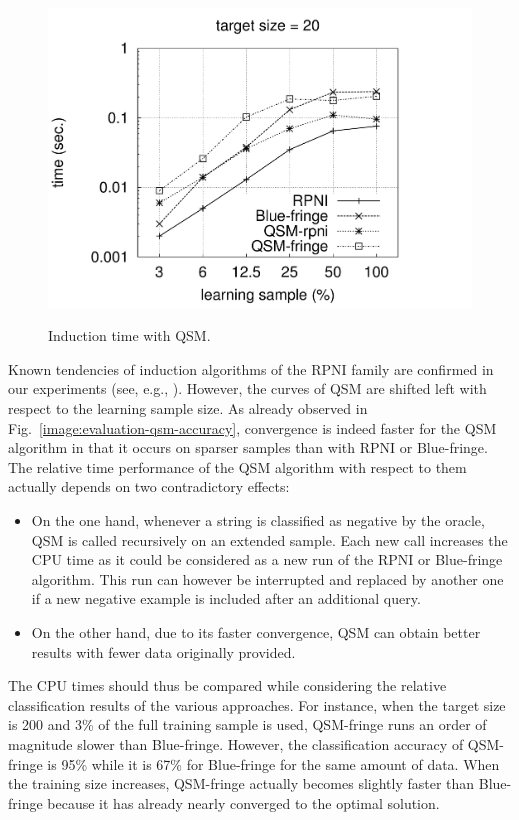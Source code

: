 \begin{figure}[t]
{  \includegraphics[trim=30mm 0mm 35mm 0mm, clip, page=4]{src/5-evaluation/images/time}
}
\caption{Induction time with QSM\label{image:evaluation-qsm-time}.}
\end{figure}

Known tendencies of induction algorithms of the RPNI family are confirmed in our experiments (see, e.g., \cite{Lang:1998}). However, the curves of QSM are shifted left with respect to the learning sample size. As already observed in Fig.~\ref{image:evaluation-qsm-accuracy}, convergence is indeed faster for the QSM algorithm in that it occurs on sparser samples than with RPNI or Blue-fringe. The relative time performance of the QSM algorithm with respect to them actually depends on two contradictory effects:
\begin{itemize}
\item On the one hand, whenever a string is classified as negative by the oracle, QSM is called recursively on an extended sample. Each new call increases the CPU time as it could be considered as a new run of the RPNI or Blue-fringe algorithm. This run can however be interrupted and replaced by another one if a new negative example is included after an additional query.
\item On the other hand, due to its faster convergence, QSM can obtain better results with fewer data originally provided. 
\end{itemize}
 
The CPU times should thus be compared while considering the relative classification results of the various approaches. For instance, when the target size is 200 and 3\% of the full training sample is used, QSM-fringe runs an order of magnitude slower than Blue-fringe. However, the classification accuracy of QSM-fringe is 95\% while it is 67\% for Blue-fringe for the same amount of data. When the training size increases, QSM-fringe actually becomes slightly faster than Blue-fringe because it has already nearly converged to the optimal solution.

